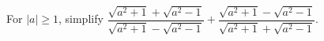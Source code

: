 For $|a|\ge1$, simplify $\dfrac{\sqrt{a^2+1}+\sqrt{a^2-1}}{\sqrt{a^2+1}-\sqrt{a^2-1}}+\dfrac{\sqrt{a^2+1}-\sqrt{a^2-1}}{\sqrt{a^2+1}+\sqrt{a^2-1}}$.
